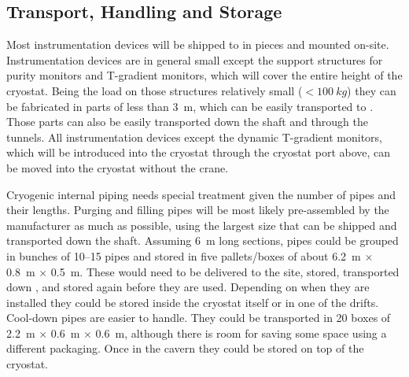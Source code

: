 \subsection{Transport, Handling and Storage}
\label{sec:fdgen-slow-cryo-install-transport}

Most instrumentation devices will be shipped to \surf in pieces and mounted on-site. 
Instrumentation devices are in general small except the support structures for purity monitors and T-gradient monitors,
which will cover the entire height of the cryostat. Being the load on those structures relatively small
 (\(<\SI{100}{kg}\)) they can be fabricated in parts of less than \SI{3}{m},
which can be easily transported to \surf. Those parts can also be easily transported down the shaft and through the tunnels.
All instrumentation devices except the dynamic T-gradient monitors, which will be introduced into the cryostat through the cryostat port above, 
can be
moved into the cryostat without the crane.

Cryogenic internal piping needs special treatment given the number of pipes and their lengths.
Purging and filling pipes will be most likely pre-assembled by the manufacturer as much as possible, using the largest  
size that can be shipped and transported down the shaft. Assuming \SI{6}{m} long sections,
pipes could be grouped in bunches of \numrange{10}{15} pipes and stored in five pallets/boxes
 of about \SI{6.2}{m} $\times$ \SI{0.8}{m} $\times$ \SI{0.5}{m}. 
These would need to be delivered to the site, stored, transported down
, and stored again before they are used.
Depending on when they are installed they could be stored inside the cryostat itself or in one of the drifts. 
Cool-down pipes are easier to handle. They could be transported in \num{20} boxes of \SI{2.2}{m} $\times$ \SI{0.6}{m} $\times$ \SI{0.6}{m}, although
there is room for saving some space using a different packaging. 
Once in the cavern they could be stored on top of the cryostat.



